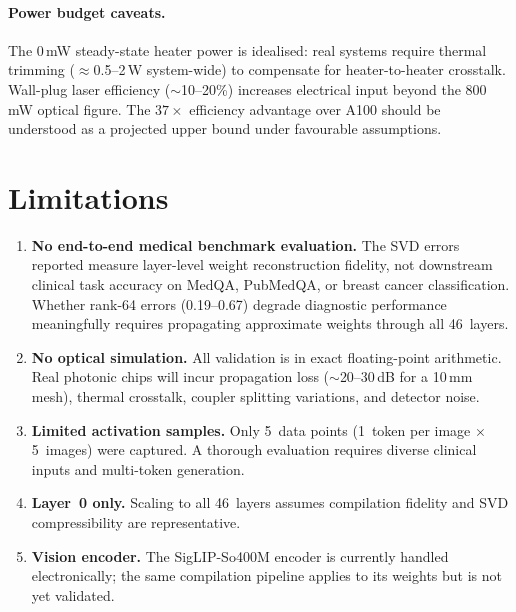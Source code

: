 \documentclass[12pt, a4paper]{article}
\begin{document}
\paragraph{Power budget caveats.}
The 0\,mW steady-state heater power is idealised: real systems require
thermal trimming ($\approx$0.5--2\,W system-wide) to compensate for
heater-to-heater crosstalk.
Wall-plug laser efficiency ($\sim$10--20\%) increases electrical input
beyond the 800\,mW optical figure.
The $37\times$ efficiency advantage over A100 should be understood as a
projected upper bound under favourable assumptions.

\section{Limitations}
\label{sec:limitations}

\begin{enumerate}
  \item \textbf{No end-to-end medical benchmark evaluation.}
        The SVD errors reported measure layer-level weight reconstruction
        fidelity, not downstream clinical task accuracy on MedQA, PubMedQA,
        or breast cancer classification.
        Whether rank-64 errors (0.19--0.67) degrade diagnostic performance
        meaningfully requires propagating approximate weights through all
        46~layers.
  \item \textbf{No optical simulation.}
        All validation is in exact floating-point arithmetic.
        Real photonic chips will incur propagation loss ($\sim$20--30\,dB for
        a 10\,mm mesh), thermal crosstalk, coupler splitting variations, and
        detector noise.
  \item \textbf{Limited activation samples.}
        Only 5~data points (1~token per image $\times$ 5~images) were captured.
        A thorough evaluation requires diverse clinical inputs and multi-token
        generation.
  \item \textbf{Layer~0 only.}
        Scaling to all 46~layers assumes compilation fidelity and SVD
        compressibility are representative.
  \item \textbf{Vision encoder.}
        The SigLIP-So400M encoder is currently handled electronically; the
        same compilation pipeline applies to its weights but is not yet
        validated.
\end{enumerate}

\end{document}
